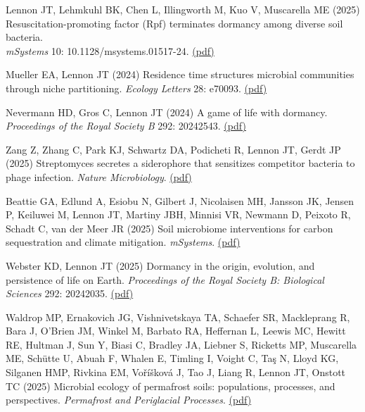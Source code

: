 \documentclass[11pt]{article}
\begin{document}
\begin{etaremune}
\item Lennon JT, Lehmkuhl BK, Chen L, Illingworth M, Kuo V, Muscarella ME (2025) \\Resuscitation-promoting factor (Rpf) terminates dormancy among diverse soil bacteria.\\
\textit{mSystems} 10: 10.1128/msystems.01517-24. \href{https://lennonlab.github.io/assets/publications/Lennon_etal_2025b.pdf}{(pdf)}

\item Mueller EA, Lennon JT (2024) Residence time structures microbial communities through niche partitioning. \textit{Ecology Letters} 28: e70093. \href{https://lennonlab.github.io/assets/publications/Mueller_Lennon_2025.pdf}{(pdf)}

\item Nevermann HD, Gros C, Lennon JT (2024) A game of life with dormancy. \textit{Proceedings of the Royal Society B} 292: 20242543. \href{https://lennonlab.github.io/assets/publications/Nevermann_etal_2025.pdf}{(pdf)}

\item Zang Z, Zhang C, Park KJ, Schwartz DA, Podicheti R, Lennon JT, Gerdt JP (2025) Streptomyces secretes a siderophore that sensitizes competitor bacteria to phage infection. \textit{Nature Microbiology}. \href{https://lennonlab.github.io/assets/publications/Zang_etal_2025.pdf}{(pdf)}

\item Beattie GA, Edlund A, Esiobu N, Gilbert J, Nicolaisen MH, Jansson JK, Jensen P, Keiluwei M, Lennon JT, Martiny JBH, Minnisi VR, Newmann D, Peixoto R, Schadt C, van der Meer JR (2025) Soil microbiome interventions for carbon sequestration and climate mitigation. \textit{mSystems}. \href{https://lennonlab.github.io/assets/publications/Beattie_etal_2025.pdf}{(pdf)}

\item Webster KD, Lennon JT (2025) Dormancy in the origin, evolution, and persistence of life on Earth. \textit{Proceedings of the Royal Society B: Biological Sciences} 292: 20242035. \href{https://lennonlab.github.io/assets/publications/Webster_Lennon_2025.pdf}{(pdf)}

\item Waldrop MP, Ernakovich JG, Vishnivetskaya TA, Schaefer SR, Mackleprang R, Bara J, O'Brien JM, Winkel M, Barbato RA, Heffernan L, Leewis MC, Hewitt RE, Hultman J, Sun Y, Biasi C, Bradley JA, Liebner S, Ricketts MP, Muscarella ME, Schütte U, Abuah F, Whalen E, Timling I, Voight C, Taş N, Lloyd KG, Silganen HMP, Rivkina EM, Voříšková J, Tao J, Liang R, Lennon JT, Onstott TC (2025) Microbial ecology of permafrost soils: populations, processes, and perspectives. \textit{Permafrost and Periglacial Processes}. \href{https://lennonlab.github.io/assets/publications/Waldrop_etal_2025.pdf}{(pdf)}


\end{etaremune}
\end{document}
